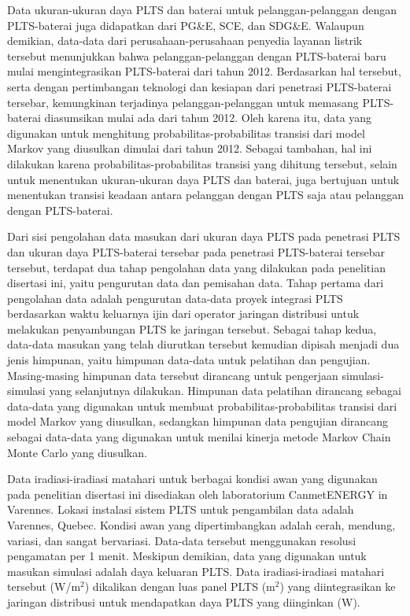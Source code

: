 Data ukuran-ukuran daya PLTS dan baterai untuk pelanggan-pelanggan dengan PLTS-baterai juga didapatkan dari PG\&E, SCE, dan SDG\&E. Walaupun demikian, data-data dari perusahaan-perusahaan penyedia layanan listrik tersebut menunjukkan bahwa pelanggan-pelanggan dengan PLTS-baterai baru mulai mengintegrasikan PLTS-baterai dari tahun 2012. Berdasarkan hal tersebut, serta dengan pertimbangan teknologi dan kesiapan dari penetrasi PLTS-baterai tersebar, kemungkinan terjadinya pelanggan-pelanggan untuk memasang PLTS-baterai diasumsikan mulai ada dari tahun 2012. Oleh karena itu, data yang digunakan untuk menghitung probabilitas-probabilitas transisi dari model Markov yang diusulkan dimulai dari tahun 2012. Sebagai tambahan, hal ini dilakukan karena probabilitas-probabilitas transisi yang dihitung tersebut, selain untuk menentukan ukuran-ukuran daya PLTS dan baterai, juga bertujuan untuk menentukan transisi keadaan antara pelanggan dengan PLTS saja atau pelanggan dengan PLTS-baterai.

Dari sisi pengolahan data masukan dari ukuran daya PLTS pada penetrasi PLTS dan ukuran daya PLTS-baterai tersebar pada penetrasi PLTS-baterai tersebar tersebut, terdapat dua tahap pengolahan data yang dilakukan pada penelitian disertasi ini, yaitu pengurutan data dan pemisahan data. Tahap pertama dari pengolahan data adalah pengurutan data-data proyek integrasi PLTS berdasarkan waktu keluarnya ijin dari operator jaringan distribusi untuk melakukan penyambungan PLTS ke jaringan tersebut. Sebagai tahap kedua, data-data masukan yang telah diurutkan tersebut kemudian dipisah menjadi dua jenis himpunan, yaitu himpunan data-data untuk pelatihan dan pengujian. Masing-masing himpunan data tersebut dirancang untuk pengerjaan simulasi-simulasi yang selanjutnya dilakukan. Himpunan data pelatihan dirancang sebagai data-data yang digunakan untuk membuat probabilitas-probabilitas transisi dari model Markov yang diusulkan, sedangkan himpunan data pengujian dirancang sebagai data-data yang digunakan untuk menilai kinerja metode Markov Chain Monte Carlo yang diusulkan.

Data iradiasi-iradiasi matahari untuk berbagai kondisi awan yang digunakan pada penelitian disertasi ini disediakan oleh laboratorium CanmetENERGY in Varennes. Lokasi instalasi sistem PLTS untuk pengambilan data adalah Varennes, Quebec. Kondisi awan yang dipertimbangkan adalah cerah, mendung, variasi, dan sangat bervariasi. Data-data tersebut menggunakan resolusi pengamatan per 1 menit. Meskipun demikian, data yang digunakan untuk masukan simulasi adalah daya keluaran PLTS. Data iradiasi-iradiasi matahari tersebut (W/m$^2$) dikalikan dengan luas panel PLTS (m$^2$) yang diintegrasikan ke jaringan distribusi untuk mendapatkan daya PLTS yang diinginkan (W).

